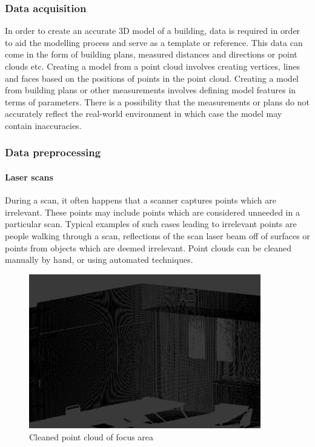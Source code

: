 \documentclass[11pt,a4paper]{report}
\begin{document}
			\subsubsection{Data acquisition}
				In order to create an accurate 3D model of a building, data is required in order to aid the modelling process and serve as a template or reference. This data can come in the form of building plans, measured distances and directions or point clouds etc.
				Creating a model from a point cloud involves creating vertices, lines and faces based on the positions of points in the point cloud.
				Creating a model from building plans or other measurements involves defining model features in terms of parameters. There is a possibility that the measurements or plans do not accurately reflect the real-world environment in which case the model may contain inaccuracies. 
				
			\subsubsection{Data preprocessing}
				\paragraph{Laser scans}
					During a scan, it often happens that a scanner captures points which are irrelevant. These points may include points which are considered unneeded in a particular scan. Typical examples of such cases leading to irrelevant points are people walking through a scan, reflections of the scan laser beam off of surfaces or points from objects which are deemed irrelevant. Point clouds can be cleaned manually by hand, or using automated techniques.
				
					\begin{figure}[h!]
						\centering
						\includegraphics[width=0.9\textwidth]{cleaned_pc}
						\caption{Cleaned point cloud of focus area}
					\end{figure}
				
\end{document}
